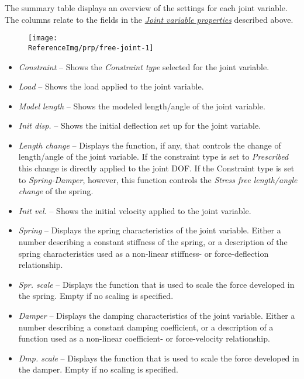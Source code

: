 
The summary table displays an overview of the settings for each joint variable.
The columns relate to the fields in the
\protect\hyperlink{joint-variable-properties}{\sl Joint variable properties}
described above.

\begin{figure}[H]
  \texttt{[image: \\ReferenceImg/prp/free-joint-1]}
\end{figure}

\begin{itemize}
\item{\sl Constraint} --
  Shows the {\sl Constraint type} selected for the joint variable.
\item{\sl Load} --
  Shows the load applied to the joint variable.
\item{\sl Model length} --
  Shows the modeled length/angle of the joint variable.
\item{\sl Init disp.} --
  Shows the initial deflection set up for the joint variable.
\item {\sl Length change} --
  Displays the function, if any, that controls the change of length/angle
  of the joint variable. If the constraint type is set to {\sl Prescribed} this
  change is directly applied to the joint DOF. If the Constraint type is set to
  {\sl Spring-Damper}, however, this function controls the
  {\sl Stress free length/angle change} of the spring.
\item{\sl Init vel.} --
  Shows the initial velocity applied to the joint variable.
\item{\sl Spring} --
  Displays the spring characteristics of the joint variable.
  Either a number describing a constant stiffness of the spring,
  or a description of the spring characteristics used as a non-linear
  stiffness- or force-deflection relationship.
\item{\sl Spr. scale} --
  Displays the function that is used to scale the force developed in the spring.
  Empty if no scaling is specified.
\item{\sl Damper} --
  Displays the damping characteristics of the joint variable.
  Either a number describing a constant damping coefficient, or a description of
  a function used as a non-linear coefficient- or force-velocity relationship.
\item{\sl Dmp. scale} --
  Displays the function that is used to scale the force developed in the damper.
  Empty if no scaling is specified.
\end{itemize}


